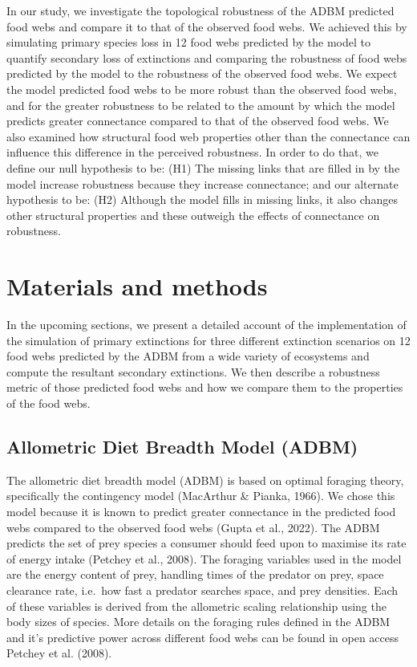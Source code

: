 \documentclass{article}
\begin{document}
In our study, we investigate the topological robustness of the ADBM
predicted food webs and compare it to that of the observed food webs. We
achieved this by simulating primary species loss in 12 food webs
predicted by the model to quantify secondary loss of extinctions and
comparing the robustness of food webs predicted by the model to the
robustness of the observed food webs. We expect the model predicted food
webs to be more robust than the observed food webs, and for the greater
robustness to be related to the amount by which the model predicts
greater connectance compared to that of the observed food webs. We also
examined how structural food web properties other than the connectance
can influence this difference in the perceived robustness. In order to
do that, we define our null hypothesis to be: (H1) The missing links
that are filled in by the model increase robustness because they
increase connectance; and our alternate hypothesis to be: (H2) Although
the model fills in missing links, it also changes other structural
properties and these outweigh the effects of connectance on robustness.

\hypertarget{materials-and-methods}{%
\section{Materials and methods}\label{materials-and-methods}}

In the upcoming sections, we present a detailed account of the
implementation of the simulation of primary extinctions for three
different extinction scenarios on 12 food webs predicted by the ADBM
from a wide variety of ecosystems and compute the resultant secondary
extinctions. We then describe a robustness metric of those predicted
food webs and how we compare them to the properties of the food webs.

\hypertarget{allometric-diet-breadth-model-adbm}{%
\subsection{Allometric Diet Breadth Model
(ADBM)}\label{allometric-diet-breadth-model-adbm}}

The allometric diet breadth model (ADBM) is based on optimal foraging
theory, specifically the contingency model (MacArthur \& Pianka, 1966).
We chose this model because it is known to predict greater connectance
in the predicted food webs compared to the observed food webs (Gupta et
al., 2022). The ADBM predicts the set of prey species a consumer should
feed upon to maximise its rate of energy intake (Petchey et al., 2008).
The foraging variables used in the model are the energy content of prey,
handling times of the predator on prey, space clearance rate, i.e.~how
fast a predator searches space, and prey densities. Each of these
variables is derived from the allometric scaling relationship using the
body sizes of species. More details on the foraging rules defined in the
ADBM and it's predictive power across different food webs can be found
in open access Petchey et al. (2008).
\end{document}

